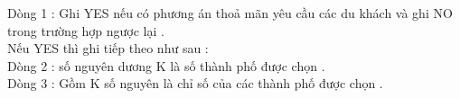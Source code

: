 Dòng 1 : Ghi YES nếu có phương án thoả mãn yêu cầu các du khách và ghi NO trong trường hợp ngược lại .   
\\   Nếu YES thì ghi tiếp theo như sau :   
\\   Dòng 2 : số nguyên dương K là số thành phố được chọn .   
\\   Dòng 3 : Gồm K số nguyên là chỉ số của các thành phố được chọn .